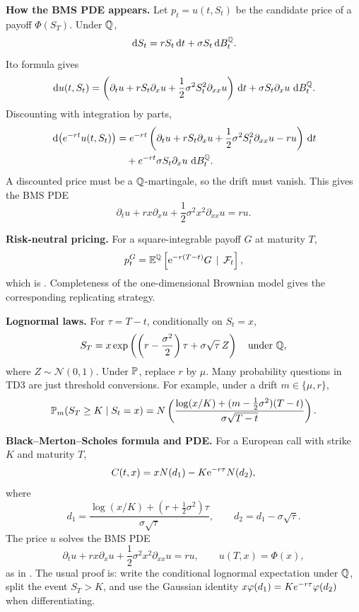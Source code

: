 \begin{techniques}
  \item \textbf{How the BMS PDE appears.}
  Let \(p_t=u(t,S_t)\) be the candidate price of a payoff \(\Phi(S_T)\).
  Under \(\Q\),
  \[
    \dd S_t=rS_t\dd t+\sigma S_t\dd B_t^\Q.
  \]
  Ito formula gives
  \[
    \dd u(t,S_t)
      =\left(\partial_tu+rS_t\partial_xu
        +\frac12\sigma^2S_t^2\partial_{xx}u\right)\dd t
       +\sigma S_t\partial_xu\,\dd B_t^\Q.
  \]
  Discounting with integration by parts,
  \[
  \begin{aligned}
    \dd\bigl(e^{-rt}u(t,S_t)\bigr)
      &=e^{-rt}\left(
        \partial_tu+rS_t\partial_xu
        +\frac12\sigma^2S_t^2\partial_{xx}u-ru
      \right)\dd t\\
      &\quad+e^{-rt}\sigma S_t\partial_xu\,\dd B_t^\Q.
  \end{aligned}
  \]
  A discounted price must be a \(\Q\)-martingale, so the drift must vanish.
  This gives the BMS PDE
  \[
    \partial_tu+rx\partial_xu
      +\frac12\sigma^2x^2\partial_{xx}u=ru.
  \]

  \item \textbf{Risk-neutral pricing.}
  For a square-integrable payoff \(G\) at maturity \(T\),
  \[
    p_t^G
      =\EQ\left[\e^{-r(T-t)}G\,\mid\,\F_t\right],
  \]
  which is .  Completeness of the one-dimensional
  Brownian model gives the corresponding replicating strategy.

  \item \textbf{Lognormal laws.}
  For \(\tau=T-t\), conditionally on \(S_t=x\),
  \[
    S_T=x\exp\left(\left(r-\frac{\sigma^2}{2}\right)\tau
      +\sigma\sqrt{\tau}\,Z\right)
    \quad\text{under }\Q,
  \]
  where \(Z\sim\mathcal N(0,1)\).  Under \(\P\), replace \(r\) by \(\mu\).
  Many probability questions in TD3 are just threshold conversions.  For
  example, under a drift \(m\in\{\mu,r\}\),
  \[
    \P_m(S_T\ge K\mid S_t=x)
      =
      \normalcdf\left(
        \frac{\log(x/K)+(m-\frac12\sigma^2)(T-t)}
             {\sigma\sqrt{T-t}}
      \right).
  \]

  \item \textbf{Black--Merton--Scholes formula and PDE.}
  For a European call with strike \(K\) and maturity \(T\),
  \[
    C(t,x)=x\normalcdf(d_1)-K\e^{-r\tau}\normalcdf(d_2),
  \]
  where
  \[
    d_1=\frac{\log(x/K)+(r+\frac12\sigma^2)\tau}{\sigma\sqrt{\tau}},
    \qquad
    d_2=d_1-\sigma\sqrt{\tau}.
  \]
  The price \(u\) solves the BMS PDE
  \[
    \partial_tu+rx\partial_xu+\frac12\sigma^2x^2\partial_{xx}u=ru,
    \qquad
    u(T,x)=\Phi(x),
  \]
  as in .
  The usual proof is: write the conditional lognormal expectation under
  \(\Q\), split the event \(S_T>K\), and use the Gaussian identity
  \(x\normalpdf(d_1)=K e^{-r\tau}\normalpdf(d_2)\) when differentiating.


\end{techniques}
